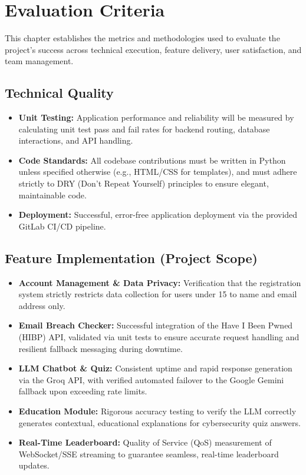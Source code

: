 \documentclass[11pt, a4paper]{report}
\begin{document}
\chapter{Evaluation Criteria}
\label{cp:criteria}

This chapter establishes the metrics and methodologies used to evaluate the project's success across technical execution, feature delivery, user satisfaction, and team management.

\section{Technical Quality}
\begin{itemize}
    \item \textbf{Unit Testing:} Application performance and reliability will be measured by calculating unit test pass and fail rates for backend routing, database interactions, and API handling.
    \item \textbf{Code Standards:} All codebase contributions must be written in Python unless specified otherwise (e.g., HTML/CSS for templates), and must adhere strictly to DRY (Don't Repeat Yourself) principles to ensure elegant, maintainable code.
    \item \textbf{Deployment:} Successful, error-free application deployment via the provided GitLab CI/CD pipeline.
\end{itemize}

\section{Feature Implementation (Project Scope)}
\begin{itemize}
    \item \textbf{Account Management \& Data Privacy:} Verification that the registration system strictly restricts data collection for users under 15 to name and email address only.
    \item \textbf{Email Breach Checker:} Successful integration of the Have I Been Pwned (HIBP) API, validated via unit tests to ensure accurate request handling and resilient fallback messaging during downtime.
    \item \textbf{LLM Chatbot \& Quiz:} Consistent uptime and rapid response generation via the Groq API, with verified automated failover to the Google Gemini fallback upon exceeding rate limits.
    \item \textbf{Education Module:} Rigorous accuracy testing to verify the LLM correctly generates contextual, educational explanations for cybersecurity quiz answers.
    \item \textbf{Real-Time Leaderboard:} Quality of Service (QoS) measurement of WebSocket/SSE streaming to guarantee seamless, real-time leaderboard updates.
\end{itemize}
\end{document}
